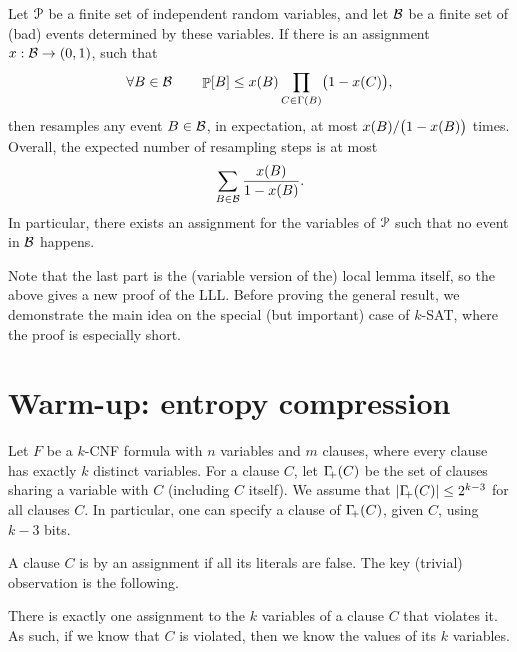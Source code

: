 \begin{theorem}
    Let $\EuScript{P}$ be a finite set of independent random variables, and
    let $\mathcal{B}$ be a finite set of (bad) events determined by
    these variables. If there is an assignment
    $x:\mathcal{B} \rightarrow (0,1)$, such that
    \begin{equation}
        \forall \BEvent \in \BEventSet%
        \qquad %
        \Prob{\BEvent} \leq x(\BEvent) \prod_{\BEventA \in
           \NbrX{\BEvent}} \bigl( 1 - x(\BEventA) \bigr),
        \eqlab{l:l:l:cond}
    \end{equation}
    then \MTAlg resamples any event ${B} \in \mathcal{B}$, in
    expectation, at most $x({B})/ \bigl(1-x({B}) \bigr)$
    times. Overall, the expected number of resampling steps is at
    most 
    \[
        \sum_{{B}\in\mathcal{B}} \frac{x({B})}{ 1-x({B}) }.
    \]
     In particular, there exists an assignment for the variables of
    $\EuScript{P}$ such that no event in $\mathcal{B}$ happens.
\end{theorem}

Note that the last part is the (variable version of the) \Lovasz
local lemma itself, so the above gives a new proof of the LLL. Before
proving the general result, we demonstrate the main idea on the
special (but important) case of $k$-SAT, where the proof is
especially short.



\section{Warm-up: entropy compression}

Let $F$ be a $k$-CNF formula with $n$ variables and $m$ clauses, where
every clause has exactly $k$ distinct variables. For a clause $C$,
let $\NbrCX{C}$ be the set of clauses sharing a variable with $C$
(including $C$ itself). We assume that
$\cardin{\NbrCX{C}} \leq 2^{k-3}$ for all clauses $C$. In particular,
one can specify a clause of $\NbrCX{C}$, given $C$, using $k-3$ bits.

A clause $C$ is  by an assignment if
all its literals are false. The key (trivial) observation is the
following.

\begin{observation}
    There is exactly one assignment to the $k$ variables of a clause
    $C$ that violates it. As such, if we know that $C$ is violated,
    then we know the values of its $k$ variables.
\end{observation}

